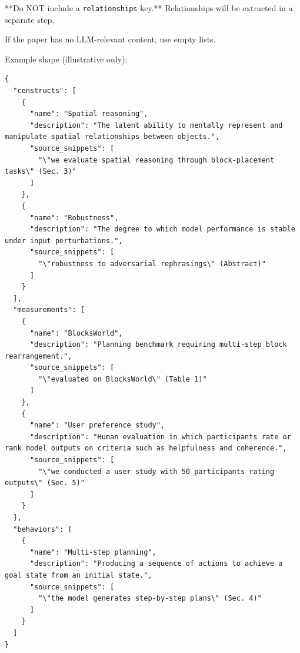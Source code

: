 \begin{tcolorbox}[breakable,enhanced,colback=blue!3,colframe=blue!40!black,title={Prompt},fonttitle=\bfseries,left=8pt,right=8pt,top=6pt,bottom=6pt]
**Do NOT include a \texttt{relationships} key.** Relationships will be extracted in a separate step.

If the paper has no LLM-relevant content, use empty lists.

Example shape (illustrative only):
\begin{verbatim}
{
  "constructs": [
    {
      "name": "Spatial reasoning",
      "description": "The latent ability to mentally represent and manipulate spatial relationships between objects.",
      "source_snippets": [
        "\"we evaluate spatial reasoning through block-placement tasks\" (Sec. 3)"
      ]
    },
    {
      "name": "Robustness",
      "description": "The degree to which model performance is stable under input perturbations.",
      "source_snippets": [
        "\"robustness to adversarial rephrasings\" (Abstract)"
      ]
    }
  ],
  "measurements": [
    {
      "name": "BlocksWorld",
      "description": "Planning benchmark requiring multi-step block rearrangement.",
      "source_snippets": [
        "\"evaluated on BlocksWorld\" (Table 1)"
      ]
    },
    {
      "name": "User preference study",
      "description": "Human evaluation in which participants rate or rank model outputs on criteria such as helpfulness and coherence.",
      "source_snippets": [
        "\"we conducted a user study with 50 participants rating outputs\" (Sec. 5)"
      ]
    }
  ],
  "behaviors": [
    {
      "name": "Multi-step planning",
      "description": "Producing a sequence of actions to achieve a goal state from an initial state.",
      "source_snippets": [
        "\"the model generates step-by-step plans\" (Sec. 4)"
      ]
    }
  ]
}
\end{verbatim}
\end{tcolorbox}
